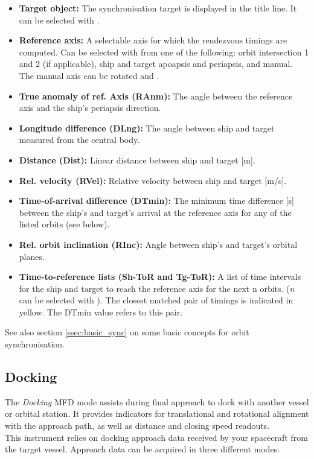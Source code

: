 \documentclass[Orbiter User Manual.tex]{subfiles}
\begin{document}
\begin{itemize}
\item \textbf{Target object:} The synchronisation target is displayed in the title line. It can be selected with \Shift{}.
\item \textbf{Reference axis:} A selectable axis for which the rendezvous timings are computed. Can be selected with \Shift{} from one of the following: orbit intersection 1 and 2 (if applicable), ship and target apoapsis and periapsis, and manual. The manual axis can be rotated \Shift\keystroke{,} and \Shift{}.
\item \textbf{True anomaly of ref. Axis (RAnm):} The angle between the reference axis and the ship's periapsis direction.
\item \textbf{Longitude difference (DLng):} The angle between ship and target measured from the central body.
\item \textbf{Distance (Dist):} Linear distance between ship and target [m].
\item \textbf{Rel. velocity (RVel):} Relative velocity between ship and target [m/s].
\item \textbf{Time-of-arrival difference (DTmin):} The minimum time difference [s] between the ship's and target's arrival at the reference axis for any of the listed orbits (see below).
\item \textbf{Rel. orbit inclination (RInc):} Angle between ship's and target's orbital planes.
\item \textbf{Time-to-reference lists (Sh-ToR and Tg-ToR):} A list of time intervals for the ship and target to reach the reference axis for the next n orbits. (\textit{n} can be selected with \Shift{}). The closest matched pair of timings is indicated in yellow. The DTmin value refers to this pair.
\end{itemize}

\noindent
See also section \ref{ssec:basic_sync} on some basic concepts for orbit synchronisation.


\subsection{Docking}
The \textit{Docking} MFD mode assists during final approach to dock with another vessel or orbital station. It provides indicators for translational and rotational alignment with the approach path, as well as distance and closing speed readouts.\\
This instrument relies on docking approach data received by your spacecraft from the target vessel. Approach data can be acquired in three different modes:
\end{document}
